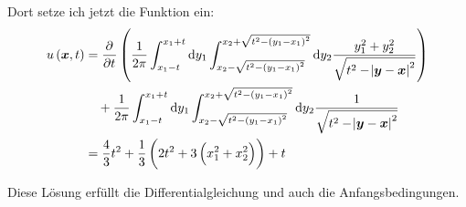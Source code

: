 \documentclass[11pt, ngerman, fleqn]{article}
\renewcommand{\vec}[1]{\boldsymbol{#1}}
\begin{document}
Dort setze ich jetzt die Funktion ein:
\begin{align*}
	u\del{\vec x, t} &= \dpd{}t \del{
		\frac{1}{2 \pi}
		\int_{x_1 - t}^{x_1 + t} \dif y_1
		\int_{x_2 - \sqrt{t^2-\del{y_1 - x_1}^2}}^{x_2 + \sqrt{t^2-\del{y_1 - x_1}^2}} \dif y_2
		\frac{y_1^2 + y_2^2}{\sqrt{t^2 - \abs{\vec y - \vec x}^2}}
	} \\
	&\quad+
	\frac{1}{2 \pi}
	\int_{x_1 - t}^{x_1 + t} \dif y_1
	\int_{x_2 - \sqrt{t^2-\del{y_1 - x_1}^2}}^{x_2 + \sqrt{t^2-\del{y_1 - x_1}^2}} \dif y_2
	\frac{1}{\sqrt{t^2 - \abs{\vec y - \vec x}^2}} \\
	&= \frac 43 t^2 + \frac 13 \del{2t^2 + 3 \del{x_1^2 + x_2^2}} + t
\end{align*}

Diese Lösung erfüllt die Differentialgleichung und auch die Anfangsbedingungen.

%
%
\end{document}
